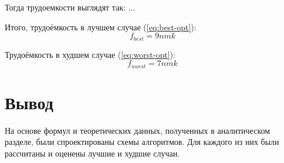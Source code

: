 Тогда трудоемкости выглядят так:
...

Итого, трудоёмкость в лучшем случае (\ref{eq:best-opt}):
\begin{equation}
    \label{eq:best-opt}
    f_{best} = 9nmk
\end{equation}

Трудоёмкость в худшем случае (\ref{eq:worst-opt}):
\begin{equation}
    \label{eq:worst-opt}
    f_{worst} = 7nmk
\end{equation}

\section*{Вывод}

На основе формул и теоретических данных, полученных в аналитическом разделе, были спроектированы схемы алгоритмов.
Для каждого из них были рассчитаны и оценены лучшие и худшие случаи.
